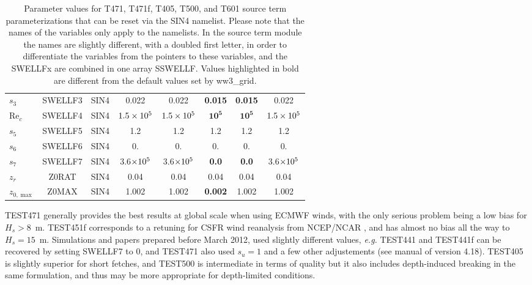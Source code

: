 \begin{landscape}
\begin{table}
\begin{center}
\begin{tabular}{|l|c|c|c|c|c|c|c|}
  $s_3$ &  SWELLF3                    & SIN4 &  0.022  &  0.022      &\textbf{0.015} &\textbf{0.015}&  0.022      \\
  $\mathrm{Re}_c$ &  SWELLF4          & SIN4 &$1.5\times 10^5$& $1.5\times 10^5$   &$\mathbf{10^5}$&$\mathbf{10^5}$&  $1.5\times 10^5$ \\
  $s_5$ &  SWELLF5                    & SIN4 & 1.2     & 1.2         & 1.2           &  1.2         & 1.2         \\
  $s_6$ &  SWELLF6                    & SIN4 & 0.      & 0.          & 0.            & 0.           & 0.          \\
  $s_7$ &  SWELLF7                    & SIN4 &3.6$\times 10^5$&3.6$\times 10^5$    &\textbf{0.0}   &\textbf{0.0}  & 3.6$\times 10^5$   \\
  $z_r$ &  Z0RAT                      & SIN4 & 0.04    & 0.04        & 0.04          &  0.04        &   0.04      \\
  $z_{0,\max}$ &  Z0MAX               & SIN4 & 1.002   & 1.002       &\textbf{0.002} &  1.002       &  1.002      \\
\hline
\end{tabular}



 \end{center}
\caption{Parameter values for T471, T471f, T405, T500, and T601 source 
term parameterizations that can be reset via the {\F SIN4} namelist. 
Please note that the names of the variables only apply to the namelists. In the
source term module the names are slightly different, with a doubled first
letter, in order to differentiate the variables from the pointers to these
variables, and the SWELLFx are combined in one array SSWELLF. Values highlighted in bold are
different from the default values set by ww3\_grid.} \label{tab:ST4_parSIN}
\end{table}
\end{landscape}

TEST471 generally provides the best results at global scale when using ECMWF winds,
with the only serious problem being a low bias for $H_s > 8$~m.  TEST451f
corresponds to a retuning for CSFR wind reanalysis from NCEP/NCAR
\citep{art:CFSRR10}, and has almost no bias all the way to $H_s =
15$~m. Simulations and papers prepared before March 2012, used slightly
different values, {\it e.g.} TEST441 and TEST441f can be recovered by setting SWELLF7 to 0, and 
TEST471 also used $s_u=1$ and a few other adjustements (see manual of version 4.18).
TEST405 is slightly superior for short fetches, and TEST500 is intermediate in
terms of quality but it also includes depth-induced breaking in the same
formulation, and thus may be more appropriate for depth-limited conditions.


